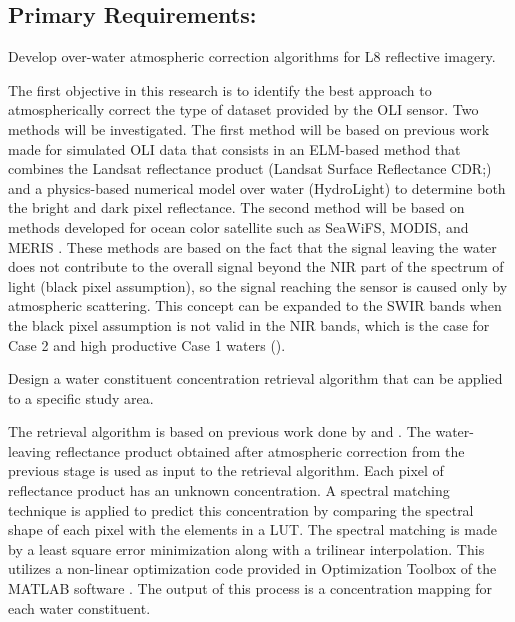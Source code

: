 \subsection{Primary Requirements:}
\begin{enumerate} 
	{\bf \item Develop over-water atmospheric correction algorithms for L8 reflective imagery.} 

The first objective in this research is to identify the best approach to atmospherically correct the type of dataset provided by the OLI sensor. Two methods will be investigated. The first method will be based on previous work made for simulated OLI data \cite{Gerace:2013,Gerace:2012,GeraceThesis,Pahlevan:2012} that consists in an ELM-based method that combines the Landsat reflectance product (Landsat Surface Reflectance CDR;\cite{LandsatCDR}) and a physics-based numerical model over water (HydroLight) to determine both the bright and dark pixel reflectance. The second method will be based on methods developed for ocean color satellite such as SeaWiFS, MODIS, and MERIS \cite{Gordon:1997}. These methods are based on the fact that the signal leaving the water does not contribute to the overall signal beyond the NIR part of the spectrum of light (black pixel assumption), so the signal reaching the sensor is caused only by atmospheric scattering. This concept can be expanded to the SWIR bands when the black pixel assumption is not valid in the NIR bands, which is the case for Case 2 and high productive Case 1 waters (\cite{Wang:2007}).

	{\bf \item Design a water constituent concentration retrieval algorithm that can be applied to a specific study area.}

The retrieval algorithm is based on previous work done by \cite{Raqueno:2003} and \cite{GeraceThesis}. The water-leaving reflectance product obtained after atmospheric correction from the previous stage is used as input to the retrieval algorithm. Each pixel of reflectance product has an unknown concentration. A spectral matching technique is applied to predict this concentration by comparing the spectral shape of each pixel with the elements in a LUT. The spectral matching is made by a least square error minimization along with a trilinear interpolation. This utilizes a non-linear optimization code provided in Optimization Toolbox of the MATLAB software . The output of this process is a concentration mapping for each water constituent.


\end{enumerate}
